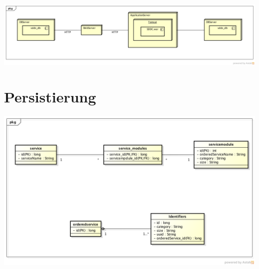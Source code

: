 \documentclass[11pt]{scrartcl}
\begin{document}
\includegraphics[width=\textwidth]{deployment}

\section{Persistierung}

\includegraphics[width=\textwidth]{Datenmodell}
\end{document}
